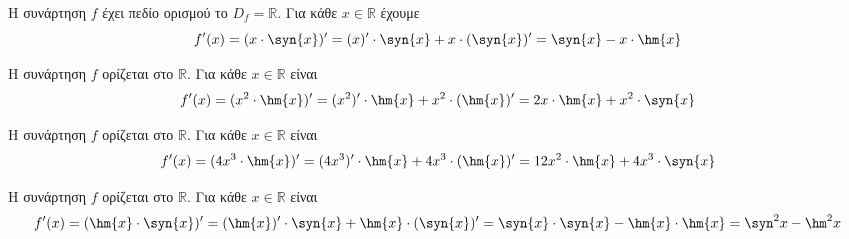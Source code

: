 \begin{alist}
\item Η συνάρτηση $ f $ έχει πεδίο ορισμού το $ D_f=\mathbb{R} $. Για κάθε $ x\in\mathbb{R} $ έχουμε
\[ f'(x)=(x\cdot\syn{x})'=(x)'\cdot\syn{x}+x\cdot(\syn{x})'=\syn{x}-x\cdot\hm{x} \]
\item Η συνάρτηση $ f $ ορίζεται στο $ \mathbb{R} $. Για κάθε $ x\in\mathbb{R} $ είναι
\[ f'(x)=(x^2\cdot\hm{x})'=(x^2)'\cdot\hm{x}+x^2\cdot(\hm{x})'=2x\cdot\hm{x}+x^2\cdot\syn{x} \]
\item Η συνάρτηση $ f $ ορίζεται στο $ \mathbb{R} $. Για κάθε $ x\in\mathbb{R} $ είναι
\[ f'(x)=(4x^3\cdot\hm{x})'=(4x^3)'\cdot\hm{x}+4x^3\cdot(\hm{x})'=12x^2\cdot\hm{x}+4x^3\cdot\syn{x} \]
\item Η συνάρτηση $ f $ ορίζεται στο $ \mathbb{R} $. Για κάθε $ x\in\mathbb{R} $ είναι
\[ f'(x)=(\hm{x}\cdot\syn{x})'=(\hm{x})'\cdot\syn{x}+\hm{x}\cdot(\syn{x})'=\syn{x}\cdot\syn{x}-\hm{x}\cdot\hm{x}=\syn^2{x}-\hm^2{x} \]
\end{alist}
